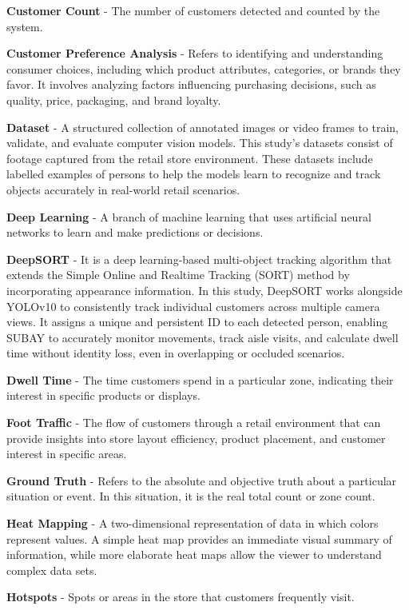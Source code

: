{\textbf{Customer Count} - The number of customers detected and counted by the system.

\textbf{Customer Preference Analysis} - Refers to identifying and understanding consumer choices, including which product attributes, categories, or brands they favor. It involves analyzing factors influencing purchasing decisions, such as quality, price, packaging, and brand loyalty.

\textbf{Dataset} - A structured collection of annotated images or video frames to train, validate, and evaluate computer vision models. This study's datasets consist of footage captured from the retail store environment. These datasets include labelled examples of persons to help the models learn to recognize and track objects accurately in real-world retail scenarios.

\textbf{Deep Learning} - A branch of machine learning that uses artificial neural networks to learn and make predictions or decisions.

\textbf{DeepSORT} - It is a deep learning-based multi-object tracking algorithm that extends the Simple Online and Realtime Tracking (SORT) method by incorporating appearance information. In this study, DeepSORT works alongside YOLOv10 to consistently track individual customers across multiple camera views. It assigns a unique and persistent ID to each detected person, enabling SUBAY to accurately monitor movements, track aisle visits, and calculate dwell time without identity loss, even in overlapping or occluded scenarios.

\textbf{Dwell Time} - The time customers spend in a particular zone, indicating their interest in specific products or displays.

\textbf{Foot Traffic} - The flow of customers through a retail environment that can provide insights into store layout efficiency, product placement, and customer interest in specific areas.

\textbf{Ground Truth} - Refers to the absolute and objective truth about a particular situation or event. In this situation, it is the real total count or zone count.

\textbf{Heat Mapping} - A two-dimensional representation of data in which colors represent values. A simple heat map provides an immediate visual summary of information, while more elaborate heat maps allow the viewer to understand complex data sets.

\textbf{Hotspots} - Spots or areas in the store that customers frequently visit.

}
